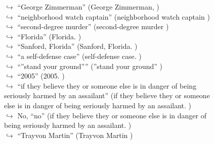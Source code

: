 \documentclass[11pt,a4paper, onecolumn]{article}
\begin{document}
\begin{figure}[t] \small \begin{tcolorbox}[boxsep=0pt,left=5pt,right=0pt,top=2pt,colback = yellow!5] \begin{dialogue}
 \small 
\colorbox{pink!25}{$\hookrightarrow$}
{ ``George Zimmerman'' (George Zimmerman, ) }
\\
\colorbox{pink!25}{$\hookrightarrow$}
{ ``neighborhood watch captain'' (neighborhood watch captain ) }
\\
\colorbox{pink!25}{$\hookrightarrow$}
{ ``second-degree murder'' (second-degree murder ) }
\\
\colorbox{pink!25}{$\hookrightarrow$}
{ ``Florida'' (Florida. ) }
\\
\colorbox{pink!25}{$\hookrightarrow$}
{ ``Sanford, Florida'' (Sanford, Florida. ) }
\\
\colorbox{pink!25}{$\hookrightarrow$}
{ ``a self-defense case'' (self-defense case. ) }
\\
\colorbox{pink!25}{$\hookrightarrow$}
{ ``''stand your ground'''' (''stand your ground'' ) }
\\
\colorbox{pink!25}{$\hookrightarrow$}
{ ``2005'' (2005. ) }
\\
\colorbox{pink!25}{$\hookrightarrow$}
{ ``if they believe they or someone else is in danger of being seriously harmed by an assailant'' (if they believe they or someone else is in danger of being seriously harmed by an assailant. ) }
\\
\colorbox{pink!25}{$\hookrightarrow$}
\colorbox{red!25}{No,}
{ ``no'' (if they believe they or someone else is in danger of being seriously harmed by an assailant. ) }
\\
\colorbox{pink!25}{$\hookrightarrow$}
{ ``Trayvon Martin'' (Trayvon Martin ) }
\\

\end{dialogue}
\end{tcolorbox}
\end{figure}
\end{document}
